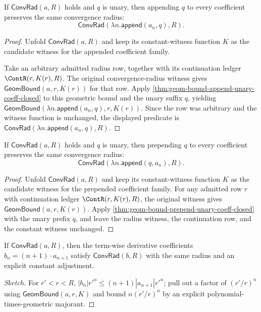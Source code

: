\begin{theorem}
\label{thm:conv-rad-append-unary-coeff-closed}
If $\mathsf{ConvRad}(a,R)$ holds and $q$ is unary, then appending $q$ to every
coefficient preserves the same convergence radius:
$$
\mathsf{ConvRad}(\lambda n.\mathsf{append}(a_n,q),R).
$$
\end{theorem}
\begin{proof}
Unfold $\mathsf{ConvRad}(a,R)$ and keep its constant-witness function $K$ as the
candidate witness for the appended coefficient family.

Take an arbitrary admitted radius row, together with its continuation ledger
$\ContR(r,K(r),R)$. The original convergence-radius witness gives
$\mathsf{GeomBound}(a,r,K(r))$ for that row. Apply
\autoref{thm:geom-bound-append-unary-coeff-closed} to this geometric bound and
the unary suffix $q$, yielding
$\mathsf{GeomBound}(\lambda n.\mathsf{append}(a_n,q),r,K(r))$. Since the row was
arbitrary and the witness function is unchanged, the displayed predicate is
$\mathsf{ConvRad}(\lambda n.\mathsf{append}(a_n,q),R)$.
\end{proof}

\begin{theorem}
\label{thm:conv-rad-prepend-unary-coeff-closed}
If $\mathsf{ConvRad}(a,R)$ holds and $q$ is unary, then prepending $q$ to every
coefficient preserves the same convergence radius:
$$
\mathsf{ConvRad}(\lambda n.\mathsf{append}(q,a_n),R).
$$
\end{theorem}
\begin{proof}
Unfold $\mathsf{ConvRad}(a,R)$ and keep its constant-witness function $K$ as the
candidate witness for the prepended coefficient family. For any admitted row
$r$ with continuation ledger $\ContR(r,K(r),R)$, the original witness gives
$\mathsf{GeomBound}(a,r,K(r))$. Apply
\autoref{thm:geom-bound-prepend-unary-coeff-closed} with the unary prefix $q$,
and leave the radius witness, the continuation row, and the constant witness
unchanged.
\end{proof}

\begin{lemma}
\label{lem:diff-preserves-radius}
If \(\mathsf{ConvRad}(a, R)\), then the term-wise derivative coefficients \(b_n = (n+1) \cdot a_{n+1}\) satisfy \(\mathsf{ConvRad}(b, R)\) with the same radius and an explicit constant adjustment.
\end{lemma}
\begin{proof}[Sketch]
For \(r' < r < R\), \(|b_n| r'^n \leq (n+1) |a_{n+1}| r'^n\); pull out a factor of \((r'/r)^n\) using \(\mathsf{GeomBound}(a, r, K)\) and bound \(n (r'/r)^n\) by an explicit polynomial-times-geometric majorant.
\end{proof}

